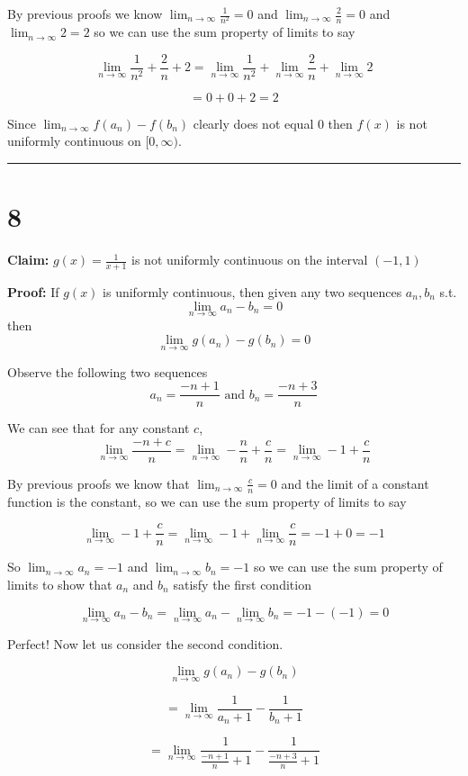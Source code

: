 \documentclass[10pt,letterpaper]{article}
\newcommand\ds{\displaystyle}
\newcommand\qedsym{\hfill \rule{2mm}{2mm}}
\begin{document}
By previous proofs we know $\ds\lim_{n\to\infty}\frac{1}{n^2} = 0$ and $\ds\lim_{n\to\infty}\frac{2}{n}=0$ and $\ds\lim_{n\to\infty}2=2$ so we can use the sum property of limits to say

\[\lim_{n\to\infty}\frac{1}{n^2}+\frac{2}{n}+2 =\lim_{n\to\infty}\frac{1}{n^2}+\lim_{n\to\infty}\frac{2}{n}+\lim_{n\to\infty}2\]

\[=0+0+2=2\]

Since $\ds\lim_{n\to\infty}f(a_n)-f(b_n)$ clearly does not equal $0$ then $f(x)$ is not uniformly continuous on $[0, \infty)$.

\qedsym

\section*{8}

\textbf{Claim:} $g(x) = \frac{1}{x+1}$ is not uniformly continuous on the interval $(-1, 1)$

\medskip

\textbf{Proof:} If $g(x)$ is uniformly continuous, then given any two sequences $a_n, b_n$ s.t. \[\ds\lim_{n\to\infty}a_n-b_n = 0\] then \[\ds\lim_{n\to\infty}g(a_n)-g(b_n) = 0\]

Observe the following two sequences
\[a_n = \frac{-n+1}{n} \text{ and } b_n = \frac{-n+3}{n}\]

We can see that for any constant $c$,
\[\lim_{n\to\infty}\frac{-n+c}{n} = \lim_{n\to\infty}-\frac{n}{n} + \frac{c}{n}=\lim_{n\to\infty}-1 + \frac{c}{n}\]

By previous proofs we know that $\ds\lim_{n\to\infty}\frac{c}{n} = 0$ and the limit of a constant function is the constant, so we can use the sum property of limits to say

\[\lim_{n\to\infty}-1 + \frac{c}{n} = \lim_{n\to\infty}-1 + \lim_{n\to\infty}\frac{c}{n}=-1+0=-1\]

So $\lim_{n\to\infty}a_n = -1$ and $\lim_{n\to\infty}b_n=-1$ so we can use the sum property of limits to show that $a_n$ and $b_n$ satisfy the first condition

\[\ds\lim_{n\to\infty}a_n-b_n = \lim_{n\to\infty}a_n - \lim_{n\to\infty}b_n = -1-(-1) = 0\]

Perfect! Now let us consider the second condition.

\[\ds\lim_{n\to\infty}g(a_n)-g(b_n)\]

\[=\ds\lim_{n\to\infty}\frac{1}{a_n+1}-\frac{1}{b_n+1}\]

\[=\ds\lim_{n\to\infty}\frac{1}{\frac{-n+1}{n}+1}-\frac{1}{\frac{-n+3}{n}+1}\]
\end{document}
